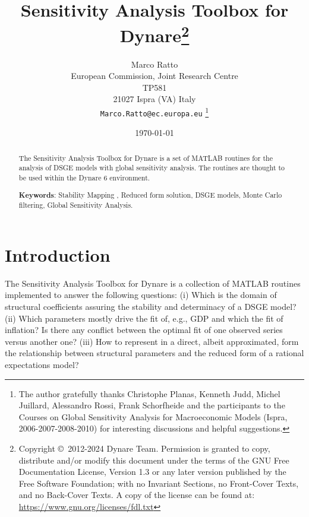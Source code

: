 \documentclass[12pt,a4paper]{article}
\begin{document}
\title{Sensitivity Analysis Toolbox for Dynare\thanks{Copyright \copyright~2012-2024 Dynare
    Team. Permission is granted to copy, distribute and/or modify
    this document under the terms of the GNU Free Documentation
    License, Version 1.3 or any later version published by the Free
    Software Foundation; with no Invariant Sections, no Front-Cover
    Texts, and no Back-Cover Texts. A copy of the license can be found
    at: \url{https://www.gnu.org/licenses/fdl.txt}}}

\author{Marco Ratto\\
European Commission, Joint Research Centre \\
TP581\\21027 Ispra
(VA) Italy\\
\texttt{Marco.Ratto@ec.europa.eu}
\thanks{The author gratefully thanks Christophe Planas, Kenneth Judd, Michel Juillard,
Alessandro Rossi, Frank Schorfheide and the participants to the
Courses on Global Sensitivity Analysis for Macroeconomic
Models (Ispra, 2006-2007-2008-2010) for interesting discussions and
helpful suggestions.}}

\date{\today}
\maketitle %


\begin{abstract}
\noindent The Sensitivity Analysis Toolbox for Dynare is a set of
MATLAB routines for the analysis of DSGE models with global
sensitivity analysis. The routines are thought to be used within
the Dynare 6 environment.


\begin{description}
  \item \textbf{Keywords}: Stability Mapping , Reduced form solution, DSGE models,
  Monte Carlo filtering, Global Sensitivity Analysis.
\end{description}
\end{abstract}
\newpage
\section{Introduction} \label{s:intro}
The Sensitivity Analysis Toolbox for Dynare is a collection of
MATLAB routines implemented to answer the following questions: (i)
Which is the domain of structural coefficients assuring the
stability and determinacy of a DSGE model? (ii) Which parameters
mostly drive the fit of, e.g., GDP and which the fit of inflation?
Is there any conflict between the optimal fit of one observed
series versus another one? (iii) How to represent in a direct,
albeit approximated, form the relationship between structural
parameters and the reduced form of a rational expectations model?
\end{document}
